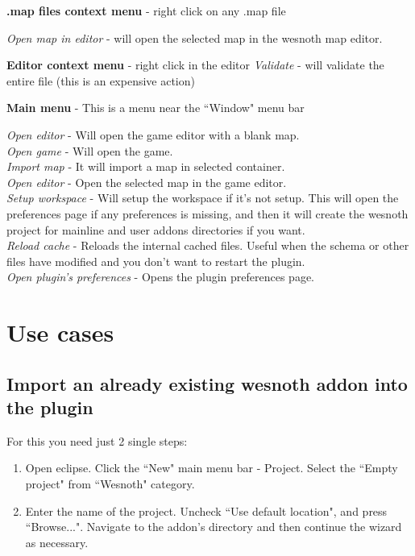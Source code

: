 \documentclass[10pt]{article}
\begin{document}
\begin{description}
\item{\textbf{.map files context menu}} - right click on any .map file

   \textit{Open map in editor} - will open the selected map in the wesnoth map editor.

\item{\textbf{Editor context menu}} - right click in the editor
   \textit{Validate} - will validate the entire file (this is an expensive action)

\item{\textbf{Main menu}} - This is a menu near the ``Window" menu bar

   \textit{Open editor} - Will open the game editor with a blank map.\\
   \textit{Open game} - Will open the game.\\
   \textit{Import map} - It will import a map in selected container.\\
   \textit{Open editor} - Open the selected map in the game editor.\\
   \textit{Setup workspace} - Will setup the workspace if it's not setup. This will open the preferences page if any preferences is missing, and then it will create the wesnoth project for mainline and user addons directories if you want.\\
   \textit{Reload cache} - Reloads the internal cached files. Useful when the schema or other files have modified and you don't want to restart the plugin.\\
   \textit{Open plugin's preferences} - Opens the plugin preferences page.\\
\end{description}

\section{Use cases} 
\subsection{Import an already existing wesnoth addon into the plugin}
For this you need just 2 single steps:
\begin{enumerate}
\item Open eclipse. Click the ``New" main menu bar - Project. Select the ``Empty project" from ``Wesnoth" category.
\item Enter the name of the project. Uncheck ``Use default location", and press ``Browse...". Navigate to the addon's directory and then continue the wizard as necessary.
\end{enumerate}
\end{document}

